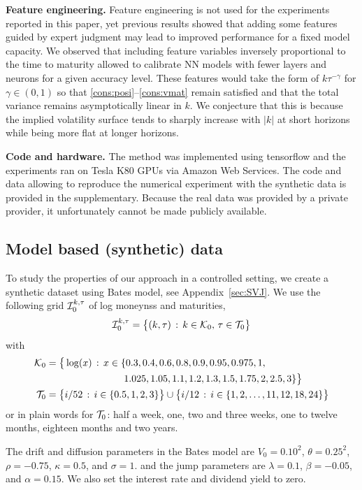 \textbf{Feature engineering.}
Feature engineering is not used for the experiments reported in this paper, yet previous results showed that adding some features guided by expert judgment may lead to improved performance for a fixed model capacity.
We observed that including feature variables inversely proportional to the time to maturity allowed to calibrate NN models with fewer layers and neurons for a given accuracy level.
These features would take the form of $k \tau^{-\gamma}$ for $\gamma\in(0,1)$ so that \ref{cons:posi}--\ref{cons:vmat} remain satisfied and that the total variance remains asymptotically linear in $k$.
We conjecture that this is because the implied volatility surface tends to sharply increase with $\lvert k \rvert$ at short horizons while being more flat at longer horizons.

\textbf{Code and hardware.}
The method was implemented using tensorflow \cite{abadi2016tensorflow} and the experiments ran on Tesla K80 GPUs via Amazon Web Services.
The code and data allowing to reproduce the numerical experiment with the synthetic data is provided in the supplementary.
Because the real data was provided by a private provider, it unfortunately cannot be made publicly available.

\subsection{Model based (synthetic) data} \label{sec:datasynt}

To study the properties of our approach in a controlled setting, we create a synthetic dataset using Bates model, see Appendix~\ref{sec:SVJ}.
We use the following grid ${\mathcal I}_{\rm 0}^{k,\tau}$ of log moneynss and maturities,
$$
{\mathcal I}_{\rm 0}^{k,\tau} = \big\{(k,\tau) \, : \, k\in{\mathcal K}_0, \,\tau \in {\mathcal T}_0\big\}
$$
with
\begin{align*}
{\mathcal K}_0 &= \big\{\log(x) \, : \, x \in \{0.3, 0.4, 0.6, 0.8, 0.9, 0.95, 0.975, 1, \\
& \qquad\qquad\qquad\qquad  1.025, 1.05, 1.1, 1.2, 1.3, 1.5, 1.75, 2, 2.5, 3 \} \big\}\\
{\mathcal T}_0 & = 
\big\{i/52 \, : \, i \in \{0.5, 1, 2, 3 \} \big\} \cup
\big\{i/12 \, : \, i\in\{1,2,\dots,11,12,18,24\} \big\}  
\end{align*}
or in plain words for ${\mathcal T}_0$: half a week, one, two and three weeks, one to twelve months, eighteen months and two years.

The drift and diffusion parameters in the Bates model are 
$V_0 = 0.10^2$,
$\theta = 0.25^2$,
$\rho = -0.75$,
$\kappa =  0.5$, and
$\sigma = 1$.
and the jump parameters are 
$\lambda = 0.1$,
$\beta = -0.05$, and
$\alpha = 0.15$.
We also set the interest rate and dividend yield to zero.


